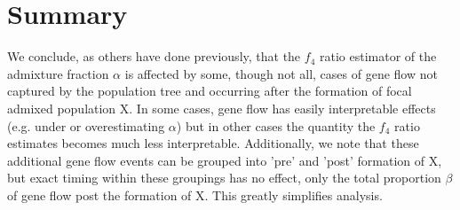 \documentclass[12pt]{report}
\begin{document}
\section{Summary}
We conclude, as others have done previously, that the $f_4$ ratio estimator of the admixture fraction $\alpha$ is affected by some, though not all, cases of gene flow not captured by the population tree and occurring after the formation of focal admixed population X. %
In some cases, gene flow has easily interpretable effects (e.g. under or overestimating $\alpha$) but in other cases the quantity the $f_4$ ratio estimates becomes much less interpretable. Additionally, we note that these additional gene flow events can be grouped into 'pre' and 'post' formation of X, but exact timing within these groupings has no effect, only the total proportion $\beta$ of gene flow post the formation of X. This greatly simplifies analysis.\\
\end{document}
